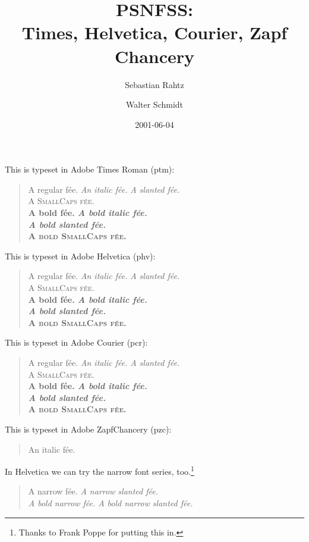 \documentclass[11pt]{article}
\begin{document}
\frenchspacing
\title{PSNFSS: \\ Times, Helvetica, Courier, Zapf Chancery}
\author{Sebastian Rahtz \and Walter Schmidt}
\date{2001-06-04}
\maketitle
\def\Try#1#2{%
{\fontfamily{#1}\selectfont
This is typeset in #2 (#1): 
\begin{quote}
\raggedright
A regular f\'ee.
\textit{An italic f\'ee.}
\textsl{A slanted f\'ee.}\\
\textsc{A SmallCaps f\'ee.}\\
{\bfseries A bold f\'ee.
 \textit{A bold italic f\'ee.}\\
 \textsl{A bold slanted f\'ee.}\\
 \textsc{A bold SmallCaps f\'ee.}\\
}
\end{quote}
\par
}}

\Try{ptm}{Adobe Times Roman}
\Try{phv}{Adobe Helvetica}
\Try{pcr}{Adobe Courier}

This is typeset in Adobe ZapfChancery (pzc):
\begin{quote}
\selectfont
An italic f\'ee.
\end{quote}

In Helvetica we can try the narrow font series, too.\footnote{Thanks to Frank
  Poppe for putting this in.}
\begin{quote}
\raggedright
{}\selectfont
\upshape A narrow f\'ee.
\slshape A narrow slanted f\'ee.\\
{\selectfont
\upshape A bold narrow f\'ee.
\slshape A bold narrow slanted f\'ee.
}
\end{quote}
\end{document}
